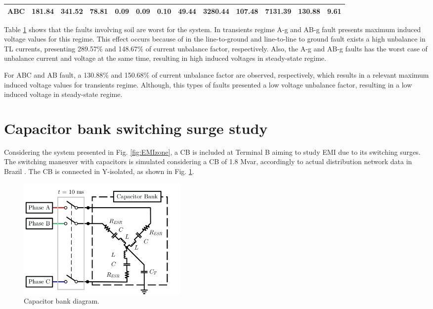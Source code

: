 \documentclass[5p,twocolumn]{elsarticle}
\begin{document}
\begin{table}[ht]
\begin{tabular}{ccccccccccccc}
		\textbf{ABC}                         & 181.84                   & 341.52                   & 78.81                    & 0.09                     & 0.09                     & 0.10                     & 49.44                   & 3280.44                   & 107.48                  & 7131.39                    & 130.88                            & 9.61                             \\ \hline
	\end{tabular}
	\label{tab:Unbalance}
	
\end{table}



Table \ref{tab:Unbalance} shows that the faults involving soil are worst for the system. In transients regime A-g and AB-g fault presents maximum induced voltage values for this regime. This effect occurs because of in the line-to-ground and line-to-line to ground fault exists a high unbalance in TL currents, presenting 289.57\% and 148.67\% of current unbalance factor, respectively. Also, the A-g and AB-g faults has the worst case of unbalance current and voltage at the same time, resulting in high induced voltages in steady-state regime.

For ABC and AB fault, a 130.88\% and 150.68\% of current unbalance factor are observed, respectively, which results in a relevant maximum induced voltage values for transients regime. Although, this types of faults presented a low voltage unbalance factor, resulting in a low induced voltage in steady-state regime.

\section{Capacitor bank switching surge study}

Considering the system presented in Fig. \ref{fig:EMIzone}, a CB is included at Terminal B aiming to study EMI due to its switching surges. The switching maneuver with capacitors is simulated considering a CB of 1.8 Mvar, accordingly to actual distribution network data in Brazil \cite{Santos2017}. The CB is connected in Y-isolated, as shown in Fig. \ref{fig:CBdiagram}. 

\begin{figure}[h]
	\begin{center}
		\includegraphics[width=8.4cm]{img/CapacitorBank.pdf}    %
		\caption{Capacitor bank diagram.} 
		\label{fig:CBdiagram}
	\end{center}
\end{figure}
\end{document}
